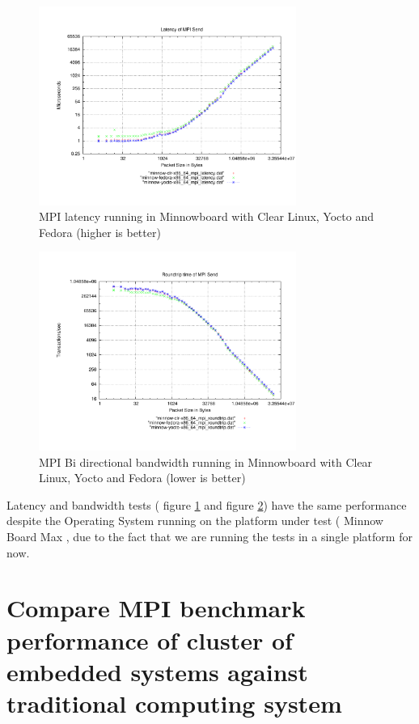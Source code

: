 \begin{figure}[H]
\centering
\includegraphics[width=0.75\textwidth]{images/mpbench_yocto_experiments/mpi_latency.pdf}
\caption{MPI latency running in Minnowboard with Clear Linux,
Yocto and Fedora (higher is better)}
\label{mpi_latency_yocto}
\end{figure}


\begin{figure}[H]
\centering
\includegraphics[width=0.75\textwidth]{images/mpbench_yocto_experiments/mpi_roundtrip.pdf}
\caption{MPI Bi directional bandwidth running in Minnowboard with Clear Linux,
Yocto and Fedora (lower is better)}
\label{mpi_roundtrip_yocto}
\end{figure}

Latency and bandwidth tests ( figure \ref{mpi_latency_yocto} and figure
\ref{mpi_roundtrip_yocto}) have the same performance despite the Operating
System running on the platform under test ( Minnow Board Max , due to the fact
that we are running the tests in a single platform for now.


\section{Compare MPI benchmark performance of cluster of embedded systems
against traditional computing system}

